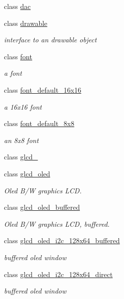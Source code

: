 \begin{DoxyCompactItemize}
class \hyperlink{classhwlib_1_1dac}{dac}
\item 
class \hyperlink{classhwlib_1_1drawable}{drawable}
\begin{DoxyCompactList}\small\item\em interface to an drawable object \end{DoxyCompactList}\item 
class \hyperlink{classhwlib_1_1font}{font}
\begin{DoxyCompactList}\small\item\em a font \end{DoxyCompactList}\item 
class \hyperlink{classhwlib_1_1font__default__16x16}{font\+\_\+default\+\_\+16x16}
\begin{DoxyCompactList}\small\item\em a 16x16 font \end{DoxyCompactList}\item 
class \hyperlink{classhwlib_1_1font__default__8x8}{font\+\_\+default\+\_\+8x8}
\begin{DoxyCompactList}\small\item\em an 8x8 font \end{DoxyCompactList}\item 
class \hyperlink{classhwlib_1_1glcd__5510}{glcd\+\_}
\item 
class \hyperlink{classhwlib_1_1glcd__oled}{glcd\+\_\+oled}
\begin{DoxyCompactList}\small\item\em Oled B/W graphics L\+CD. \end{DoxyCompactList}\item 
class \hyperlink{classhwlib_1_1glcd__oled__buffered}{glcd\+\_\+oled\+\_\+buffered}
\begin{DoxyCompactList}\small\item\em Oled B/W graphics L\+CD, buffered. \end{DoxyCompactList}\item 
class \hyperlink{classhwlib_1_1glcd__oled__i2c__128x64__buffered}{glcd\+\_\+oled\+\_\+i2c\+\_\+128x64\+\_\+buffered}
\begin{DoxyCompactList}\small\item\em buffered oled window \end{DoxyCompactList}\item 
class \hyperlink{classhwlib_1_1glcd__oled__i2c__128x64__direct}{glcd\+\_\+oled\+\_\+i2c\+\_\+128x64\+\_\+direct}
\begin{DoxyCompactList}\small\item\em buffered oled window \end{DoxyCompactList}\item 

\end{DoxyCompactItemize}
